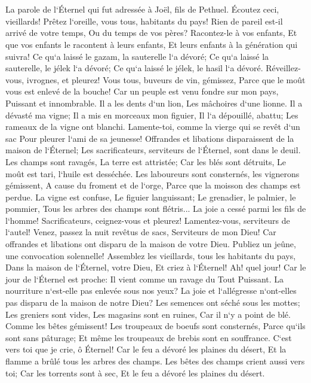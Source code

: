 

\chapter{}

\verse La parole de l`Éternel qui fut adressée à Joël, fils de Pethuel. 
\verse Écoutez ceci, vieillards! Prêtez l`oreille, vous tous, habitants du pays! Rien de pareil est-il arrivé de votre temps, Ou du temps de vos pères? 
\verse Racontez-le à vos enfants, Et que vos enfants le racontent à leurs enfants, Et leurs enfants à la génération qui suivra! 
\verse Ce qu`a laissé le gazam, la sauterelle l`a dévoré; Ce qu`a laissé la sauterelle, le jélek l`a dévoré; Ce qu`a laissé le jélek, le hasil l`a dévoré. 
\verse Réveillez-vous, ivrognes, et pleurez! Vous tous, buveurs de vin, gémissez, Parce que le moût vous est enlevé de la bouche! 
\verse Car un peuple est venu fondre sur mon pays, Puissant et innombrable. Il a les dents d`un lion, Les mâchoires d`une lionne. 
\verse Il a dévasté ma vigne; Il a mis en morceaux mon figuier, Il l`a dépouillé, abattu; Les rameaux de la vigne ont blanchi. 
\verse Lamente-toi, comme la vierge qui se revêt d`un sac Pour pleurer l`ami de sa jeunesse! 
\verse Offrandes et libations disparaissent de la maison de l`Éternel; Les sacrificateurs, serviteurs de l`Éternel, sont dans le deuil. 
\verse Les champs sont ravagés, La terre est attristée; Car les blés sont détruits, Le moût est tari, l`huile est desséchée. 
\verse Les laboureurs sont consternés, les vignerons gémissent, A cause du froment et de l`orge, Parce que la moisson des champs est perdue. 
\verse La vigne est confuse, Le figuier languissant; Le grenadier, le palmier, le pommier, Tous les arbres des champs sont flétris... La joie a cessé parmi les fils de l`homme! 
\verse Sacrificateurs, ceignez-vous et pleurez! Lamentez-vous, serviteurs de l`autel! Venez, passez la nuit revêtus de sacs, Serviteurs de mon Dieu! Car offrandes et libations ont disparu de la maison de votre Dieu. 
\verse Publiez un jeûne, une convocation solennelle! Assemblez les vieillards, tous les habitants du pays, Dans la maison de l`Éternel, votre Dieu, Et criez à l`Éternel! 
\verse Ah! quel jour! Car le jour de l`Éternel est proche: Il vient comme un ravage du Tout Puissant. 
\verse La nourriture n`est-elle pas enlevée sous nos yeux? La joie et l`allégresse n`ont-elles pas disparu de la maison de notre Dieu? 
\verse Les semences ont séché sous les mottes; Les greniers sont vides, Les magasins sont en ruines, Car il n`y a point de blé. 
\verse Comme les bêtes gémissent! Les troupeaux de boeufs sont consternés, Parce qu`ils sont sans pâturage; Et même les troupeaux de brebis sont en souffrance. 
\verse C`est vers toi que je crie, ô Éternel! Car le feu a dévoré les plaines du désert, Et la flamme a brûlé tous les arbres des champs. 
\verse Les bêtes des champs crient aussi vers toi; Car les torrents sont à sec, Et le feu a dévoré les plaines du désert. 

